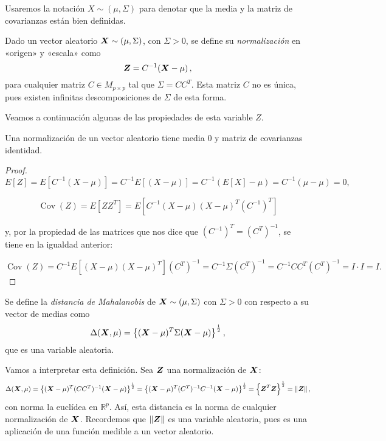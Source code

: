 \begin{nota}
  Usaremos la notación $X\sim(\mu,\Sigma)$ para denotar que la media y la matriz de covarianzas están bien definidas.
\end{nota}

\begin{ndef}[Normalización]
    Dado un vector aleatorio $\boldsymbol{X}\sim(\mu,\Sigma)$, con $\Sigma>0$, se define su \emph{normalización} en «origen» y «escala» como
    \[
  \boldsymbol{Z} = C^{-1}(\boldsymbol{X} - \mu)\,,
\]
para cualquier matriz $C\in M_{p\times p}$ tal que $\Sigma = CC^T$. Esta matriz $C$ no es única, pues existen infinitas descomposiciones de $\Sigma$ de esta forma.

  \end{ndef}

Veamos a continuación algunas de las propiedades de esta variable $Z$.
\begin{nprop}
  Una normalización de un vector aleatorio tiene media $0$ y matriz de covarianzas identidad.
\end{nprop}

\begin{proof} \hfill\\
    \[
    E[Z] = E[C^{-1}(X-\mu)] = C^{-1}E[(X-\mu)] = C^{-1}(E[X] - \mu) = C^{-1}(\mu - \mu ) = 0,
    \]

    \[
    \operatorname{Cov}(Z) = E[ZZ ^T] = E[C^{-1}(X-\mu)(X-\mu)^T(C^{-1})^T]
    \]

    y, por la propiedad de las matrices que nos dice que $(C^{-1})^T = (C^T)^{-1}$, se tiene en la igualdad anterior:

    \[
      \operatorname{Cov}(Z) = C^{-1}E[(X-\mu)(X-\mu)^T](C^T)^{-1} = C^{-1} \Sigma (C^T)^{-1} = C^{-1}CC^T(C^T)^{-1} = I \cdot I = I
    .\]

\end{proof}
  \begin{ndef}
    Se define la \emph{distancia de Mahalanobis} de $\boldsymbol{X}\sim(\mu,\Sigma)$ con $\Sigma > 0$ con respecto a su vector de medias como
    \[
    \Delta(\boldsymbol{X},\mu) = \left\{ (\boldsymbol{X}-\mu)^T \Sigma (\boldsymbol{X}-\mu) \right\} ^{\frac{1}{2}},
    \]
    que es una variable aleatoria.
  \end{ndef}

  Vamos a interpretar esta definición. Sea $\boldsymbol{Z}$ una normalización de $\boldsymbol{X}$:
  \[
  \Delta(\boldsymbol{X},\mu) = \left\{ (\boldsymbol{X}-\mu)^T (CC^T)^{-1}(\boldsymbol{X}-\mu)\right\}^{\frac{1}{2}} = \left\{ (\boldsymbol{X}-\mu)^T (C^T)^{-1}C^{-1}(\boldsymbol{X}-\mu)\right\}^{\frac{1}{2}} = \left\{\boldsymbol{Z}^T \boldsymbol{Z}\right\}^{\frac{1}{2}} = \Vert \boldsymbol{Z}\Vert\,,
  \]
  con norma la euclídea en $\mathbb R^p$. Así, esta distancia es la norma de cualquier normalización de $\boldsymbol{X}$. Recordemos que $\Vert \boldsymbol{Z}\Vert$ es una variable aleatoria, pues es una aplicación de una función medible a un vector aleatorio.

